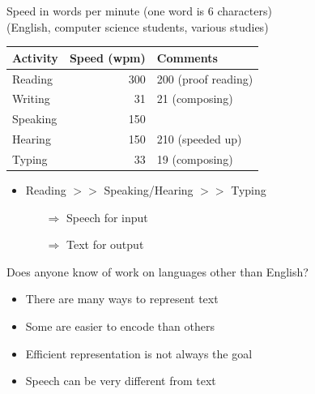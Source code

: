 \documentclass[a4paper,landscape,headrule,footrule,xetex]{foils}
\begin{document}

Speed in words per minute (one word is 6 characters)
\\ (English, computer science students, various studies)

\begin{tabular}{lrl}
 Activity           & Speed (wpm) & Comments \\ \hline
  Reading            & 300 & 200 (proof reading)\\
  Writing              & 31 & 21 (composing) \\ 
  Speaking             & 150 & \\
  Hearing              & 150 & 210 (speeded up)  \\
  Typing               & 33  & 19 (composing) 
\end{tabular}
\begin{itemize}
\item Reading $>>$ Speaking/Hearing $>>$ Typing
  \begin{itemize}
  \item[$\Rightarrow$] Speech for input
  \item[$\Rightarrow$] Text for output
  \end{itemize}
\end{itemize}

Does anyone know of work on languages other than English?



\begin{itemize}
\item There are many ways to represent text
\item Some are easier to encode than others
\item Efficient representation is not always the goal
\item Speech can be very different from text
\end{itemize}




\end{document}
